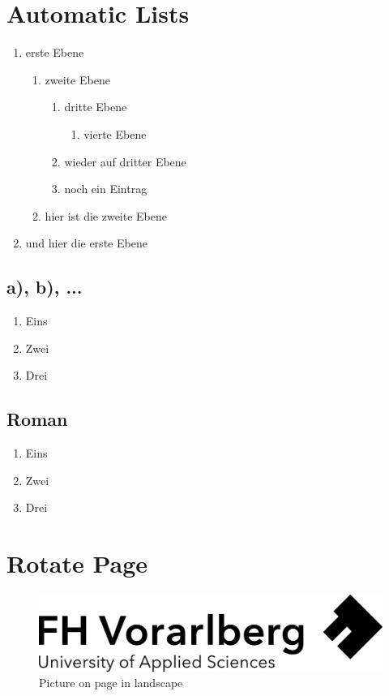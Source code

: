 \section{Automatic Lists}

\begin{enumerate}
\item erste Ebene
\begin{enumerate}
\item zweite Ebene
\begin{enumerate}
\item dritte Ebene
\begin{enumerate}
\item vierte Ebene
\end{enumerate}
\item wieder auf dritter Ebene 
\item noch ein Eintrag 
\end{enumerate}
\item hier ist die zweite Ebene
\end{enumerate}
\item und hier die erste Ebene
\end{enumerate}

\subsection{a), b), ...}

\renewcommand{\labelenumi}{\alph{enumi})}
\begin{enumerate}
\item Eins
\item Zwei
\item Drei
\end{enumerate}

\subsection{Roman}

\renewcommand{\labelenumi}{\roman{enumi}}
\begin{enumerate}
\item Eins
\item Zwei
\item Drei
\end{enumerate}

\section{Rotate Page}
\begin{landscape}
\thispagestyle{empty}
\begin{figure}
    \centering
    \includegraphics[width=1.5\textheight]{images/Logo-A3.jpg}
    \caption{Picture on page in landscape}
    \label{fig:other}
\end{figure}
\end{landscape}